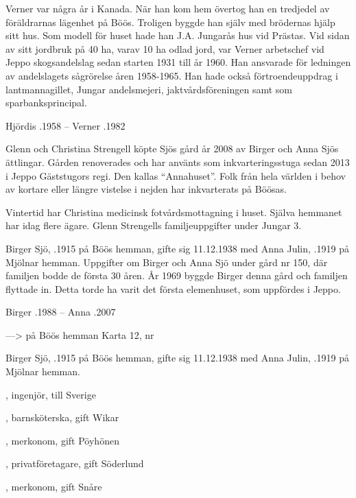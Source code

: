 Verner var några år i Kanada. När han kom hem övertog han en tredjedel av föräldrarnas lägenhet på Böös. Troligen byggde han själv med brödernas hjälp sitt hus. Som modell för huset hade han J.A. Jungarås hus vid Prästas. Vid sidan av sitt jordbruk på 40 ha, varav 10 ha odlad jord, var Verner arbetschef vid Jeppo skogsandelslag sedan starten 1931 till år 1960. Han ansvarade för ledningen av andelslagets sågrörelse åren 1958-1965. Han hade också förtroendeuppdrag i lantmannagillet, Jungar andelsmejeri, jaktvårdsföreningen samt som sparbanksprincipal.

Hjördis .1958  --  Verner .1982




Glenn och Christina Strengell köpte Sjös gård år 2008 av Birger och Anna Sjös ättlingar. Gården renoverades och har använts som
inkvarteringsstuga sedan 2013 i Jeppo Gäststugors regi. Den kallas ``Annahuset''. Folk från hela världen i behov av kortare eller längre vistelse i nejden har inkvarterats på Böösas.


Vintertid har Christina medicinsk fotvårdsmottagning i huset. Själva hemmanet har idag flere ägare. Glenn Strengells familjeuppgifter under Jungar 3.


Birger Sjö, .1915 på Böös hemman, gifte sig 11.12.1938 med Anna Julin, .1919 på Mjölnar hemman. Uppgifter om Birger och Anna Sjö under gård nr 150, där familjen bodde de första 30 åren. År 1969 byggde Birger denna gård och familjen flyttade in. Detta torde ha varit det första elemenhuset, som uppfördes i Jeppo.

Birger .1988  --  Anna .2007


--->  på Böös hemman	Karta 12,  nr 

Birger Sjö, .1915 på Böös hemman, gifte sig 11.12.1938 med Anna Julin, .1919 på Mjölnar hemman.
\begin{jhchildren}
  \item {}, ingenjör, till Sverige
  \item {}, barnsköterska, gift Wikar
  \item {}, merkonom, gift Pöyhönen
  \item {}, privatföretagare, gift Söderlund
  \item {}, merkonom, gift Snåre
\end{jhchildren}

